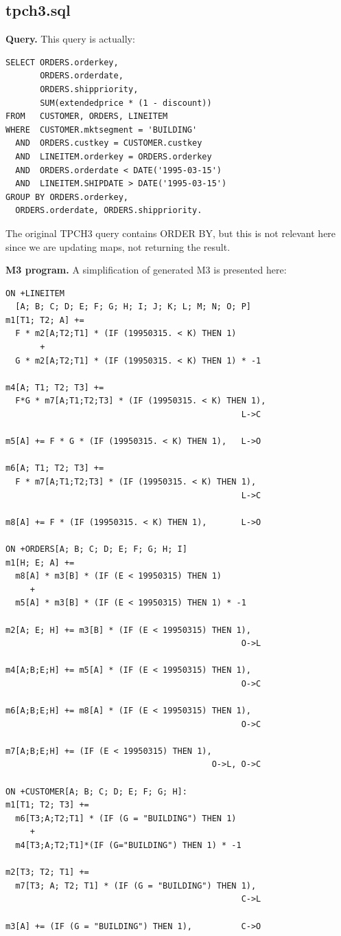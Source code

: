 \documentclass{sig-semester}
\begin{document}
\subsection{tpch3.sql}
\textbf{Query.} This query is actually:

\begin{verbatim}
SELECT ORDERS.orderkey, 
       ORDERS.orderdate,
       ORDERS.shippriority,
       SUM(extendedprice * (1 - discount))
FROM   CUSTOMER, ORDERS, LINEITEM
WHERE  CUSTOMER.mktsegment = 'BUILDING'
  AND  ORDERS.custkey = CUSTOMER.custkey
  AND  LINEITEM.orderkey = ORDERS.orderkey
  AND  ORDERS.orderdate < DATE('1995-03-15')
  AND  LINEITEM.SHIPDATE > DATE('1995-03-15')
GROUP BY ORDERS.orderkey, 
  ORDERS.orderdate, ORDERS.shippriority.
\end{verbatim}
The original TPCH3 query contains ORDER BY, but this is not relevant here since we are updating maps, not returning the result.

\newpage
\textbf{M3 program.} A simplification of generated M3 is presented here:
\begin{verbatim}
ON +LINEITEM
  [A; B; C; D; E; F; G; H; I; J; K; L; M; N; O; P] 
m1[T1; T2; A] +=
  F * m2[A;T2;T1] * (IF (19950315. < K) THEN 1)
       + 
  G * m2[A;T2;T1] * (IF (19950315. < K) THEN 1) * -1

m4[A; T1; T2; T3] +=
  F*G * m7[A;T1;T2;T3] * (IF (19950315. < K) THEN 1),
                                                L->C
     
m5[A] += F * G * (IF (19950315. < K) THEN 1),   L->O
 
m6[A; T1; T2; T3] +=
  F * m7[A;T1;T2;T3] * (IF (19950315. < K) THEN 1),    
                                                L->C

m8[A] += F * (IF (19950315. < K) THEN 1),       L->O    

ON +ORDERS[A; B; C; D; E; F; G; H; I]
m1[H; E; A] +=
  m8[A] * m3[B] * (IF (E < 19950315) THEN 1)
     + 
  m5[A] * m3[B] * (IF (E < 19950315) THEN 1) * -1
   
m2[A; E; H] += m3[B] * (IF (E < 19950315) THEN 1),    
                                                O->L
 
m4[A;B;E;H] += m5[A] * (IF (E < 19950315) THEN 1),
                                                O->C
 
m6[A;B;E;H] += m8[A] * (IF (E < 19950315) THEN 1),
                                                O->C
 
m7[A;B;E;H] += (IF (E < 19950315) THEN 1),      
                                          O->L, O->C

ON +CUSTOMER[A; B; C; D; E; F; G; H]: 
m1[T1; T2; T3] +=
  m6[T3;A;T2;T1] * (IF (G = "BUILDING") THEN 1)
     + 
  m4[T3;A;T2;T1]*(IF (G="BUILDING") THEN 1) * -1
 
m2[T3; T2; T1] +=
  m7[T3; A; T2; T1] * (IF (G = "BUILDING") THEN 1),  
                                                C->L
 
m3[A] += (IF (G = "BUILDING") THEN 1),          C->O  
\end{verbatim}
\end{document}
